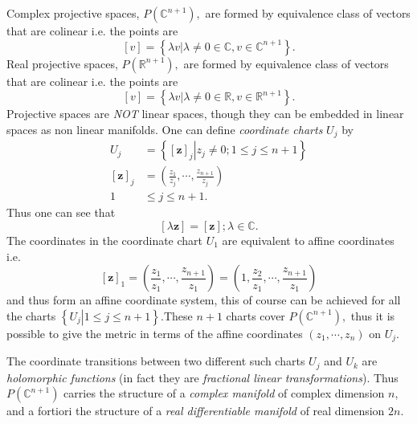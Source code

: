 \documentclass[aps,preprint]{revtex4}%
\begin{document}
Complex projective spaces, $P\left(  \mathbb{C}^{n+1}\right)  ,$ are formed by
equivalence class of vectors that are colinear i.e. the points are
\begin{equation}
\left[  v\right]  =\left\{  \left.  \lambda v\right\vert \lambda\neq
0\in\mathbb{C},v\in\mathbb{C}^{n+1}\right\}  .
\end{equation}
Real projective spaces, $P\left(  \mathbb{R}^{n+1}\right)  ,$ are formed by
equivalence class of vectors that are colinear i.e. the points are
\begin{equation}
\left[  v\right]  =\left\{  \left.  \lambda v\right\vert \lambda\neq
0\in\mathbb{R},v\in\mathbb{R}^{n+1}\right\}  .
\end{equation}
Projective spaces are \emph{NOT} linear spaces, though they can be embedded in
linear spaces as non linear manifolds. One can define \emph{coordinate charts}
$U_{j}$ by
\begin{align}
U_{j}  &  =\left\{  \left.  \left[  \mathbf{z}\right]  _{j}\right\vert
z_{j}\neq0;1\leq j\leq n+1\right\} \\
\left[  \mathbf{z}\right]  _{j}  &  =\left(  \frac{z_{1}}{z_{j}},\cdots
,\frac{z_{n+1}}{z_{j}}\right) \\
1  &  \leq j\leq n+1.
\end{align}
Thus one can see that
\begin{equation}
\left[  \lambda\mathbf{z}\right]  =\left[  \mathbf{z}\right]  ;\lambda
\in\mathbb{C}.
\end{equation}
The coordinates in the coordinate chart $U_{1}$ are equivalent to affine
coordinates i.e.
\begin{equation}
\left[  \mathbf{z}\right]  _{1}=\left(  \frac{z_{1}}{z_{1}},\cdots
,\frac{z_{n+1}}{z_{1}}\right)  =\left(  1,\frac{z_{2}}{z_{1}},\cdots
,\frac{z_{n+1}}{z_{1}}\right)
\end{equation}
and thus form an affine coordinate system, this of course can be achieved for
all the charts $\left\{  \left.  U_{j}\right\vert 1\leq j\leq n+1\right\}
.$These $n+1$ charts cover $P\left(  \mathbb{C}^{n+1}\right)  ,$ thus it is
possible to give the metric in terms of the affine coordinates $\left(
z_{1},\cdots,z_{n}\right)  $ on $U_{j}.$

The coordinate transitions between two different such charts $U_{j}$ and
$U_{k}$ are \emph{holomorphic functions} (in fact they are \emph{fractional
linear transformations}). Thus $P\left(  \mathbb{C}^{n+1}\right)  $ carries
the structure of a \emph{complex manifold} of complex dimension $n$, and a
fortiori the structure of a \emph{real differentiable manifold} of real
dimension $2n$.
\end{document}
